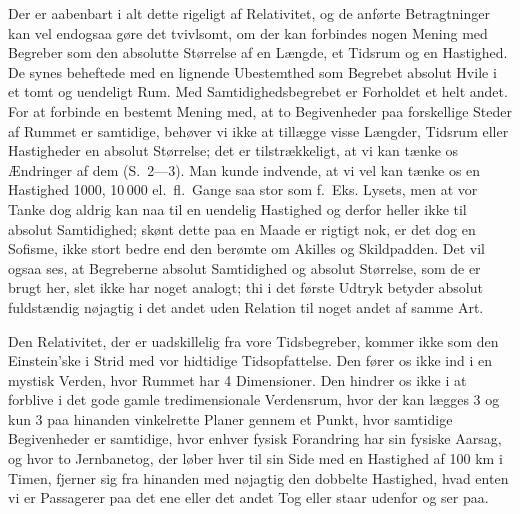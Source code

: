 \documentclass[12pt,a4paper]{article}
\newcommand{\opage}[1]{\marginnote{\footnotesize\textit{[#1]}}}
\begin{document}
Der er aabenbart i alt dette rigeligt af \guillemotleft
Relativitet\guillemotright, og de anførte Betragtninger kan vel endogsaa gøre
det tvivlsomt, om der kan forbindes nogen Mening med Begreber som den absolutte
Størrelse af en Længde, et Tidsrum og en Hastighed. De synes beheftede med en
lignende Ubestemthed som Begrebet absolut Hvile i et tomt og uendeligt Rum. Med
Samtidighedsbegrebet er Forholdet et helt andet. For at forbinde en bestemt
Mening med, at to Begivenheder paa forskellige Steder af Rummet er samtidige,
behøver vi ikke at tillægge visse Længder, Tidsrum eller Hastigheder en absolut
Størrelse; det er tilstrækkeligt, at vi kan tænke os Ændringer af dem
(S.~2---3). Man kunde indvende, at vi vel kan tænke os en Hastighed 1000,
10\,000 el.\ fl.\ Gange saa stor som f.~Eks. Lysets, men
\opage{13} at vor Tanke dog aldrig kan naa til en uendelig Hastighed og derfor heller ikke
til \guillemotleft absolut\guillemotright{} Samtidighed; skønt dette paa en
Maade er rigtigt nok, er det dog en Sofisme, ikke stort bedre end den berømte
om Akilles og Skildpadden. Det vil ogsaa ses, at Begreberne \guillemotleft
absolut Samtidighed\guillemotright{} og \guillemotleft absolut
Størrelse\guillemotright, som de er brugt her, slet ikke har noget analogt; thi
i det første Udtryk betyder \guillemotleft absolut\guillemotright{}
\guillemotleft fuldstændig nøjagtig\guillemotright{} i det andet
\guillemotleft uden Relation til noget andet af samme Art\guillemotright.

Den Relativitet, der er uadskillelig fra vore Tidsbegreber, kommer ikke som den
Einstein'ske i Strid med vor hidtidige Tidsopfattelse. Den fører os ikke ind i
en mystisk Verden, hvor Rummet har 4 Dimensioner. Den hindrer os ikke i at
forblive i det gode gamle tredimensionale Verdensrum, hvor der kan lægges 3 og
kun 3 paa hinanden vinkelrette Planer gennem et Punkt, hvor samtidige
Begivenheder er samtidige, hvor enhver fysisk Forandring har sin fysiske
Aarsag, og hvor to Jernbanetog, der løber hver til sin Side med en Hastighed af
100 km i Timen, fjerner sig fra hinanden med nøjagtig den dobbelte Hastighed,
hvad enten vi er Passagerer paa det ene eller det andet Tog eller staar
udenfor og ser paa.
\end{document}
